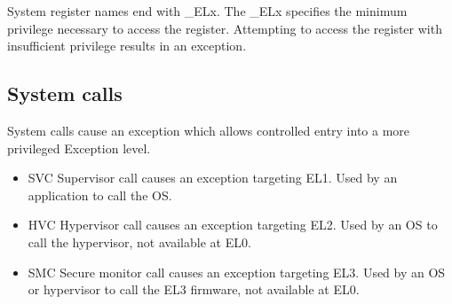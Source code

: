 \documentclass[letterpaper,12pt]{article}
\begin{document}
System register names end with \_ELx. The \_ELx specifies the minimum privilege necessary to access the register. Attempting to access the register with insufficient privilege results in an exception.

\subsection{System calls}
System calls cause an exception which allows controlled entry into a more privileged Exception level. 

\begin{itemize}
    \item SVC Supervisor call causes an exception targeting EL1. Used by an application to call the OS.
    \item HVC Hypervisor call causes an exception targeting EL2. Used by an OS to call the hypervisor, not available at EL0.
    \item SMC Secure monitor call causes an exception targeting EL3. Used by an OS or hypervisor to call the EL3 firmware, not available at EL0.
\end{itemize}
\end{document}
